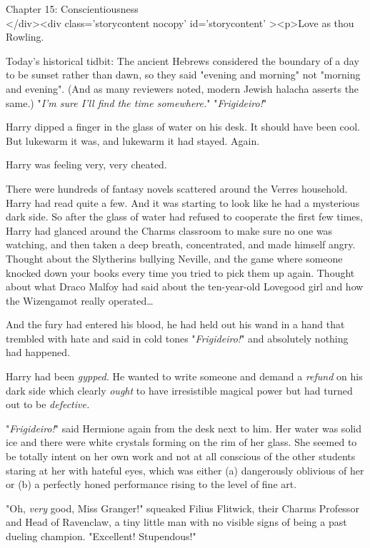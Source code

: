
Chapter 15: Conscientiousness\\
</div><div  class='storycontent nocopy' id='storycontent' ><p>Love as thou 
Rowling.

Today's historical tidbit: The ancient Hebrews considered the boundary of a day 
to be sunset rather than dawn, so they said "evening and morning" not "morning 
and evening". (And as many reviewers noted, modern Jewish halacha asserts the 
same.)
\sbreak
"\emph{I'm sure I'll find the time somewhere.}"
\sbreak
"\emph{Frigideiro!}"

Harry dipped a finger in the glass of water on his desk. It should have been 
cool. But lukewarm it was, and lukewarm it had stayed. Again.

Harry was feeling very, very cheated.

There were hundreds of fantasy novels scattered around the Verres household. 
Harry had read quite a few. And it was starting to look like he had a 
mysterious dark side. So after the glass of water had refused to cooperate the 
first few times, Harry had glanced around the Charms classroom to make sure no 
one was watching, and then taken a deep breath, concentrated, and made himself 
angry. Thought about the Slytherins bullying Neville, and the game where 
someone knocked down your books every time you tried to pick them up again. 
Thought about what Draco Malfoy had said about the ten-year-old Lovegood girl 
and how the Wizengamot really operated{\ldots}

And the fury had entered his blood, he had held out his wand in a hand that 
trembled with hate and said in cold tones "\emph{Frigideiro!}" and absolutely 
nothing had happened.

Harry had been \emph{gypped.} He wanted to write someone and demand a 
\emph{refund} on his dark side which clearly \emph{ought} to have irresistible 
magical power but had turned out to be \emph{defective.}

"\emph{Frigideiro!}" said Hermione again from the desk next to him. Her water 
was solid ice and there were white crystals forming on the rim of her glass. 
She seemed to be totally intent on her own work and not at all conscious of the 
other students staring at her with hateful eyes, which was either (a) 
dangerously oblivious of her or (b) a perfectly honed performance rising to the 
level of fine art.

"Oh, \emph{very} good, Miss Granger!" squeaked Filius Flitwick, their Charms 
Professor and Head of Ravenclaw, a tiny little man with no visible signs of 
being a past dueling champion. "Excellent! Stupendous!"

